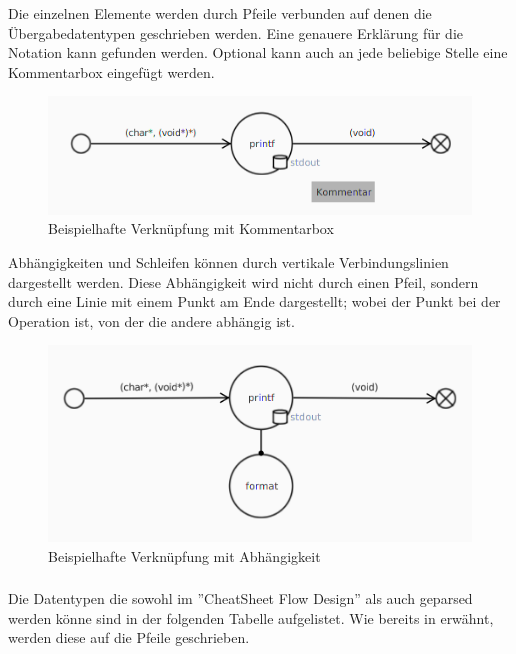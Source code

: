 Die einzelnen Elemente werden durch Pfeile verbunden auf denen die Übergabedatentypen geschrieben werden. Eine genauere
Erklärung für die Notation kann  gefunden werden. Optional kann auch an jede beliebige Stelle
eine Kommentarbox eingefügt werden.
\begin{figure}[H]
	\centering
	\includegraphics[width=\maxwidth{.9\textwidth}]{Element_connected_comment.png}
	\caption{Beispielhafte Verknüpfung mit Kommentarbox}
	\label{flowElementConnectedComment}
\end{figure}

Abhängigkeiten und Schleifen können durch vertikale Verbindungslinien dargestellt werden. Diese Abhängigkeit wird nicht durch einen
Pfeil, sondern durch eine Linie mit einem Punkt am Ende dargestellt; wobei der Punkt bei der Operation ist, von der die andere
abhängig ist.
\begin{figure}[H]
	\centering
	\includegraphics[width=\maxwidth{.9\textwidth}]{Element_connected_dep.png}
	\caption{Beispielhafte Verknüpfung mit Abhängigkeit}
	\label{flowElementConnectedDep}
\end{figure}

\subsubsection{\textFlowNotation}
\label{\textFlowNotation}
Die Datentypen die sowohl im ''CheatSheet Flow Design'' \cite{flowDesign} als auch geparsed werden könne sind in der folgenden
Tabelle aufgelistet. Wie bereits in  erwähnt, werden diese auf die Pfeile geschrieben.

